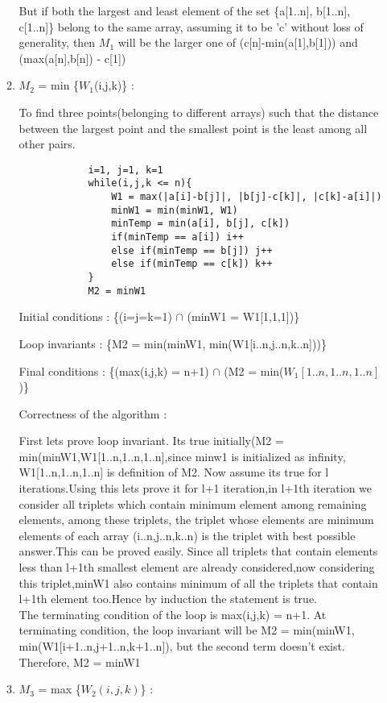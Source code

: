 \documentclass[12pt]{article}
\begin{document}
\begin{enumerate}
\begin{enumerate}
        But if both the largest and least element of the set \{a[1..n], b[1..n], c[1..n]\} belong to the same array, assuming it to be 'c' without loss of generality, then $M_1$ will be the larger one of (c[n]-min(a[1],b[1])) and (max(a[n],b[n]) - c[1]) 
        \item$M_2$ = min \{$W_1$(i,j,k)\} : 
        
        To find three points(belonging to different arrays) such that the distance between the largest point and the smallest point is the least among all other pairs.
        \begin{verbatim}
            i=1, j=1, k=1
            while(i,j,k <= n){
                W1 = max(|a[i]-b[j]|, |b[j]-c[k]|, |c[k]-a[i]|)
                minW1 = min(minW1, W1)
                minTemp = min(a[i], b[j], c[k])
                if(minTemp == a[i]) i++
                else if(minTemp == b[j]) j++
                else if(minTemp == c[k]) k++
            }
            M2 = minW1
        \end{verbatim}
        Initial conditions : \{(i=j=k=1) $\cap$ (minW1 = W1[1,1,1])\}
        
        Loop invariants : \{M2 = min(minW1, min(W1[i..n,j..n,k..n]))\}
        
        Final conditions : \{(max(i,j,k) = n+1) $\cap$ (M2 = min($W_1[1..n,1..n,1..n]$)\}
        
        Correctness of the algorithm : 
        
        First lets prove loop invariant.
        Its true initially(M2 = min(minW1,W1[1..n,1..n,1..n],since minw1 is initialized as infinity, W1[1..n,1..n,1..n] is definition of M2.
        Now assume its true for l iterations.Using this lets prove it for l+1 iteration,in l+1th iteration we consider all triplets which contain minimum element among remaining elements, among these triplets, the triplet whose elements are minimum elements of each array (i..n,j..n,k..n) is the triplet with best possible answer.This can be proved easily.
        Since all triplets that contain elements less than l+1th smallest element are already considered,now considering this triplet,minW1 also contains minimum of all the triplets that contain l+1th element too.Hence by induction the statement is true.
        \\The terminating condition of the loop is max(i,j,k) = n+1. At terminating condition, the loop invariant will be M2 = min(minW1, min(W1[i+1..n,j+1..n,k+1..n]), but the second term doesn't exist. Therefore, M2 = minW1        
        \item $M_3$ = max \{$W_2(i,j,k)$\} :


\end{enumerate}
\end{enumerate}
\end{document}
